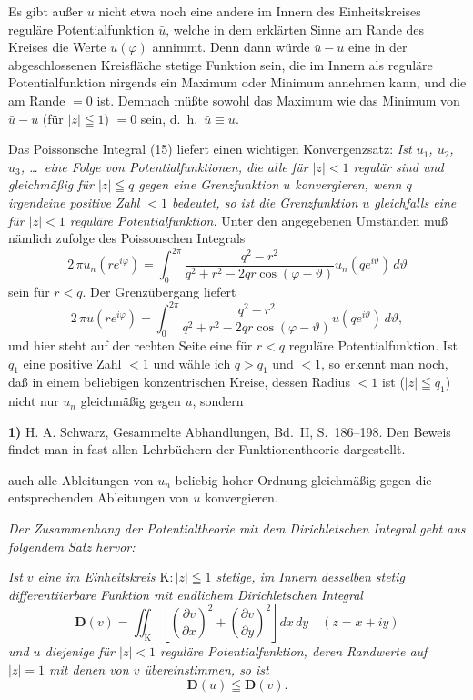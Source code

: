\documentclass{article}
\begin{document}
Es gibt außer $u$ nicht etwa noch eine andere im Innern des Einheitskreises reguläre Potentialfunktion $\bar{u}$, welche in dem erklärten Sinne am Rande des Kreises die Werte $u(\varphi)$ annimmt. Denn dann würde $\bar{u} - u$ eine in der abgeschlossenen Kreisfläche stetige Funktion sein, die im Innern als reguläre Potentialfunktion nirgends ein Maximum oder Minimum annehmen kann, und die am Rande $= 0$ ist. Demnach müßte sowohl das Maximum wie das Minimum von $\bar{u} - u$ (für $|z| \leqq 1$) $= 0$ sein, d.~h.\ $\bar{u} \equiv u$.

Das Poissonsche Integral (15) liefert einen wichtigen Konvergenzsatz: \emph{Ist $u_1$, $u_2$, $u_3$, \dots\ eine Folge von Potentialfunktionen, die alle für $|z| < 1$ regulär sind und gleichmäßig für $|z| \leqq q$ gegen eine Grenzfunktion $u$ konvergieren, wenn $q$ irgendeine positive Zahl $< 1$ bedeutet, so ist die Grenzfunktion $u$ gleichfalls eine für $|z| < 1$ reguläre Potentialfunktion.} Unter den angegebenen Umständen muß nämlich zufolge des Poissonschen Integrals
\[ 2\,\pi u_n(r e^{i\varphi}) = \int_0^{2\pi} \frac{q^2 - r^2}{q^2 + r^2 - 2qr \cos(\varphi - \vartheta)} u_n(q e^{i\vartheta})\,d\vartheta \]
sein für $r < q$. Der Grenzübergang liefert
\[ 2\,\pi u(r e^{i\varphi}) = \int_0^{2\pi} \frac{q^2 - r^2}{q^2 + r^2 - 2qr \cos(\varphi - \vartheta)} u(q e^{i\vartheta})\,d\vartheta, \]
und hier steht auf der rechten Seite eine für $r < q$ reguläre Potentialfunktion. Ist $q_1$ eine positive Zahl $< 1$ und wähle ich $q > q_1$ und $< 1$, so erkennt man noch, daß in einem beliebigen konzentrischen Kreise, dessen Radius $< 1$ ist ($|z| \leqq q_1$) nicht nur $u_n$ gleichmäßig gegen $u$, sondern

\textbf{1)} H. A. Schwarz, Gesammelte Abhandlungen, Bd.~II, S.~186--198. Den Beweis findet man in fast allen Lehrbüchern der Funktionentheorie dargestellt.

auch alle Ableitungen von $u_n$ beliebig hoher Ordnung gleichmäßig gegen die entsprechenden Ableitungen von $u$ konvergieren.

\emph{Der Zusammenhang der Potentialtheorie mit dem Dirichletschen Integral geht aus folgendem Satz hervor:}

\emph{Ist $v$ eine im Einheitskreis $\mathrm{K}\colon |z| \leqq 1$ stetige, im Innern desselben stetig differentiierbare Funktion mit endlichem Dirichletschen Integral}
\[ \mathbf{D}(v) = \iint_{\mathrm{K}} \left[ \left(\frac{\partial v}{\partial x}\right)^2 + \left(\frac{\partial v}{\partial y}\right)^2 \right] dx\,dy \quad (z = x + iy) \]
\emph{und $u$ diejenige für $|z| < 1$ reguläre Potentialfunktion, deren Randwerte auf $|z| = 1$ mit denen von $v$ übereinstimmen, so ist}
\[ \mathbf{D}(u) \leqq \mathbf{D}(v). \tag{16} \]
\end{document}
